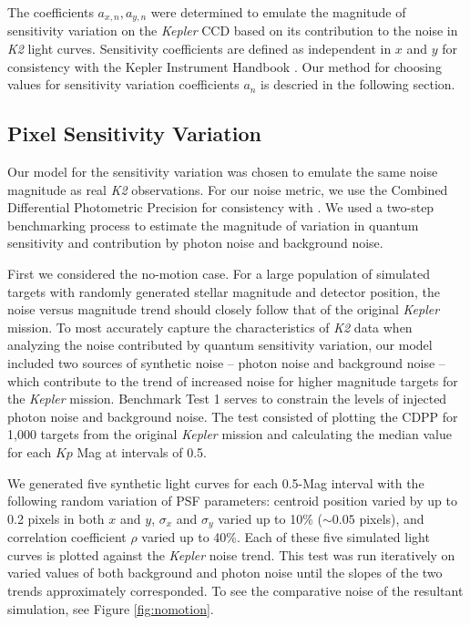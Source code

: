 \documentclass[12pt,preprint]{aastex}
\begin{document}
The coefficients $a_{x,n}, a_{y,n}$ were determined to emulate the magnitude of sensitivity variation on the \textit{Kepler} CCD based on its contribution to the noise in \textit{K2} light curves. Sensitivity coefficients are defined as independent in $x$ and $y$ for consistency with the Kepler Instrument Handbook \citep{kepler_intrument_handbook}. Our method for choosing values for sensitivity variation coefficients $a_n$ is descried in the following section.

\subsection{Pixel Sensitivity Variation}

Our model for the sensitivity variation was chosen to emulate the same noise magnitude as real \textit{K2} observations. For our noise metric, we use the Combined Differential Photometric Precision for consistency with \cite{2016AJ....152..100L}. We used a two-step benchmarking process to estimate the magnitude of variation in quantum sensitivity and contribution by photon noise and background noise.

First we considered the no-motion case. For a large population of simulated targets with randomly generated stellar magnitude and detector position, the noise versus magnitude trend should closely follow that of the original \textit{Kepler} mission. To most accurately capture the characteristics of \textit{K2} data when analyzing the noise contributed by quantum sensitivity variation, our model included two sources of synthetic noise -- photon noise and background noise -- which contribute to the trend of increased noise for higher magnitude targets for the \textit{Kepler} mission. Benchmark Test 1 serves to constrain the levels of injected photon noise and background noise. The test consisted of plotting the CDPP for 1,000 targets from the original \textit{Kepler} mission and calculating the median value for each $Kp$ Mag at intervals of 0.5.

We generated five synthetic light curves for each 0.5-Mag interval with the following random variation of PSF parameters: centroid position varied by up to 0.2 pixels in both $x$ and $y$, $\sigma_x$ and $\sigma_y$ varied up to 10\% (${\sim}0.05$ pixels), and correlation coefficient $\rho$ varied up to 40\%. Each of these five simulated light curves is plotted against the \textit{Kepler} noise trend. This test was run iteratively on varied values of both background and photon noise until the slopes of the two trends approximately corresponded. To see the comparative noise of the resultant simulation, see Figure \ref{fig:nomotion}.
\end{document}
